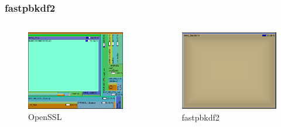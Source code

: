 \documentclass[aspectratio=169]{beamer}
\begin{document}
\frame
{
  \frametitle{fastpbkdf2}

  \begin{columns}[c]
      \begin{figure}[h]
        \includegraphics[width=\textwidth]{imgs/boxplot-openssl.png}
        \caption*{OpenSSL}
      \end{figure}

      \begin{figure}[h]
        \includegraphics[width=\textwidth]{imgs/boxplot-fast.png}
        \caption*{fastpbkdf2}
      \end{figure}
  \end{columns}
}
\end{document}
